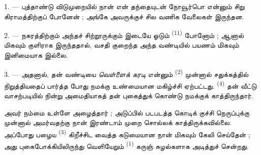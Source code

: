 %

\VUsaut{4.0mm}
\VUsaut{3.0mm}
\VUfilet{16mm}
\VUsaut{5.6mm}
\VUsaut{3.0mm}

\VUsaut{3.0mm}

\VUsaut{4.0mm}

1. --- புத்தாண்டு விடுமுறையில் நான் என் தந்தையுடன் நோவூர்பொ என்னும் சிறு
கிராமத்திற்குப் போனேன் ; அங்கே அவருக்குச் சில வணிக வேலைகள் இருந்தன.

2. --- நகரத்திற்கும் அந்தச் சிற்றூருக்கும் இடையே ஓடும்  \textsuperscript{(11)} போனோம் ; ஆனால் மிகவும் குளிராக
இருந்ததால், வசதி குறைந்த அந்த வண்டியில் பயணம் மிகவும் இனிமையாக
இல்லை.

3. --- அதனால்,  தன் வண்டியை \textit{வெள்ளைக் கரடி}
என்னும்  \textsuperscript{(2)} முன்னால்
சதுக்கத்தில் நிறுத்தியதைப் பார்த்த போது நமக்கு உண்மையான மகிழ்ச்சி
ஏற்பட்டது.  \textsuperscript{(4)} தன் வீட்டு
வாசற்படியில் நின்று அமைதியாகத் தன் 
புகைத்துக் கொண்டு நமக்குக் காத்திருந்தார்.

அவர் நம்மை உள்ளே அழைத்தார் ; அடுப்பில் படபடத்த கொடிக் குச்சி
நெருப்புக்கு முன்னால் அமர்வதற்கு நான் இரண்டாம் முறை சொல்லக்
காத்திருக்கவில்லை. அப்போது பழைய 
\textsuperscript{(3)} கிறீச்சிட வைத்த கடுமையான  நான்
மிகவும் கேலி செய்தேன் ; அது புகைபோக்கியிலிருந்து வெளியேறும்
 \textsuperscript{(1)} கருஞ் சுழல்களாக அடித்துச்
சென்றது.

